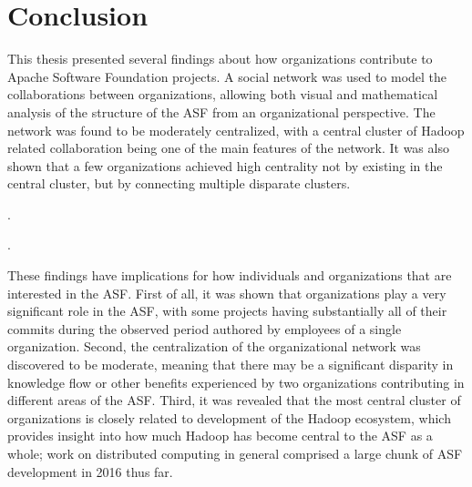 \chapter{Conclusion}
This thesis presented several findings about how organizations contribute to Apache Software Foundation projects. A social network was used to model the collaborations between organizations, allowing both visual and mathematical analysis of the structure of the ASF from an organizational perspective. The network was found to be moderately centralized, with a central cluster of Hadoop related collaboration being one of the main features of the network. It was also shown that a few organizations achieved high centrality not by existing in the central cluster, but by connecting multiple disparate clusters.

. 

. 

These findings have implications for how individuals and organizations that are interested in the ASF. First of all, it was shown that organizations play a very significant role in the ASF, with some projects having substantially all of their commits during the observed period authored by employees of a single organization. Second, the centralization of the organizational network was discovered to be moderate, meaning that there may be a significant disparity in knowledge flow or other benefits experienced by two organizations contributing in different areas of the ASF. Third, it was revealed that the most central cluster of organizations is closely related to development of the Hadoop ecosystem, which provides insight into how much Hadoop has become central to the ASF as a whole; work on distributed computing in general comprised a large chunk of ASF development in 2016 thus far.

